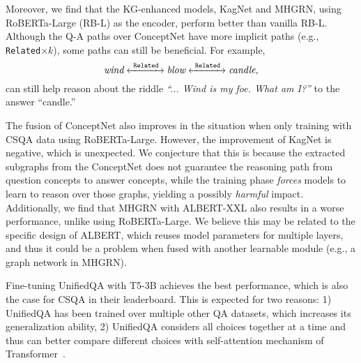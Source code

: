 Moreover, we find that the {KG-enhanced models}, KagNet and MHGRN, 
using RoBERTa-Large (RB-L) as the encoder, perform better than vanilla RB-L.
Although the Q-A paths over ConceptNet have more implicit paths (e.g., \texttt{Related}$\times k$),
some paths can still be beneficial. For example, $$\textit{wind} \xleftrightarrow[]{~\texttt{Related}~} \textit{blow} \xleftrightarrow[]{~\texttt{Related}~} \textit{candle},$$
can still help reason about the riddle \textit{``... Wind is my foe. What am I?''} to the answer ``candle.''

The fusion of ConceptNet also improves in the situation when only training with CSQA data using RoBERTa-Large.
However, the improvement of KagNet is negative, which is unexpected. 
We conjecture that this is because the extracted subgraphs from the ConceptNet does not guarantee the reasoning path from question concepts to answer concepts, while the training phase \textit{forces} models to learn to reason over those graphs, yielding a possibly \textit{harmful} impact.
Additionally, we find that MHGRN with ALBERT-XXL also results in a worse performance, unlike using RoBERTa-Large.
We believe this may be related to the specific design of ALBERT, which reuses model parameters for multiple layers, and thus it could be a problem when fused with another learnable module (e.g., a graph network in MHGRN).



Fine-tuning UnifiedQA with T5-3B achieves the best performance, which is also the case for CSQA in their leaderboard. 
This is expected for two reasons: 1) UnifiedQA has been trained over multiple other QA datasets, which increases its generalization ability, 2) UnifiedQA considers all choices together at a time and thus can better compare different choices with self-attention mechanism of Transformer~\cite{vaswani2017attention}.




